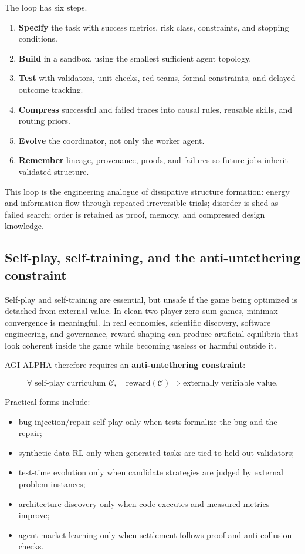 \documentclass[11pt]{article}
\providecommand{\tightlist}{\setlength{\itemsep}{0pt}\setlength{\parskip}{0pt}}
\begin{document}
The loop has six steps.

\begin{enumerate}
\def\labelenumi{\arabic{enumi}.}
\tightlist
\item
  \textbf{Specify} the task with success metrics, risk class, constraints, and stopping conditions.
\item
  \textbf{Build} in a sandbox, using the smallest sufficient agent topology.
\item
  \textbf{Test} with validators, unit checks, red teams, formal constraints, and delayed outcome tracking.
\item
  \textbf{Compress} successful and failed traces into causal rules, reusable skills, and routing priors.
\item
  \textbf{Evolve} the coordinator, not only the worker agent.
\item
  \textbf{Remember} lineage, provenance, proofs, and failures so future jobs inherit validated structure.
\end{enumerate}

This loop is the engineering analogue of dissipative structure formation: energy and information flow through repeated irreversible trials; disorder is shed as failed search; order is retained as proof, memory, and compressed design knowledge.

\subsection{Self-play, self-training, and the anti-untethering constraint}\label{self-play-self-training-and-the-anti-untethering-constraint}

Self-play and self-training are essential, but unsafe if the game being optimized is detached from external value. In clean two-player zero-sum games, minimax convergence is meaningful. In real economies, scientific discovery, software engineering, and governance, reward shaping can produce artificial equilibria that look coherent inside the game while becoming useless or harmful outside it.

AGI ALPHA therefore requires an \textbf{anti-untethering constraint}:

\[
\forall \; \text{self-play curriculum } \mathcal{C},
\quad
\text{reward}(\mathcal{C})
\Rightarrow
\text{externally verifiable value}.
\]

Practical forms include:

\begin{itemize}
\tightlist
\item
  bug-injection/repair self-play only when tests formalize the bug and the repair;
\item
  synthetic-data RL only when generated tasks are tied to held-out validators;
\item
  test-time evolution only when candidate strategies are judged by external problem instances;
\item
  architecture discovery only when code executes and measured metrics improve;
\item
  agent-market learning only when settlement follows proof and anti-collusion checks.
\end{itemize}
\end{document}
